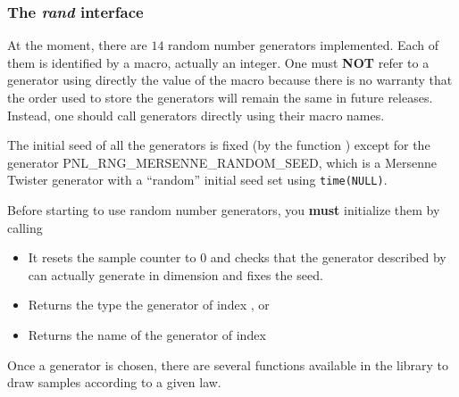 

\subsubsection{The {\em rand} interface}
\label{rand-int}

At the moment, there are $14$ random number generators implemented. Each of them is
identified by a macro, actually an integer. One must {\bf NOT} refer to a generator
using directly the value of the macro  because there is no warranty
that the order used to store the generators will remain the same in future releases.
Instead, one should call generators directly using their macro names.

The initial seed of all the generators is fixed (by the function
) except for the generator
PNL_RNG_MERSENNE_RANDOM_SEED, which is a Mersenne Twister generator with a
``random'' initial seed set using \verb!time(NULL)!.

Before starting to use random number generators, you {\bf must} initialize them by
calling
\begin{itemize}
\item {}
  \sshortdescribe It resets the sample counter to $0$ and checks that the
  generator described by  can actually generate
   in dimension  and fixes the seed.
\end{itemize}

\begin{itemize}

\item {}
  \sshortdescribe Returns the type the generator of index ,
   or 

\item {}
  \sshortdescribe Returns the name of the generator of index 
\end{itemize}

Once a generator is chosen, there are several functions available in the
library to draw samples according to a given law.

